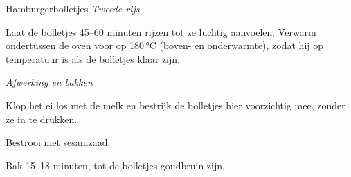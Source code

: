 \begin{recipe}{Hamburgerbolletjes}
\medskip
\noindent\textit{Tweede rijs}
\begin{steps}
  \item Laat de bolletjes 45–60 minuten rijzen tot ze luchtig aanvoelen.
        Verwarm ondertussen de oven voor op 180\,°C (boven- en
        onderwarmte), zodat hij op temperatuur is als de bolletjes klaar
        zijn.
\end{steps}

\medskip
\noindent\textit{Afwerking en bakken}
\begin{steps}
  \item Klop het ei los met de melk en bestrijk de bolletjes hier
        voorzichtig mee, zonder ze in te drukken.
  \item Bestrooi met sesamzaad.
  \item Bak 15–18 minuten, tot de bolletjes goudbruin zijn.
\end{steps}

\end{recipe}
